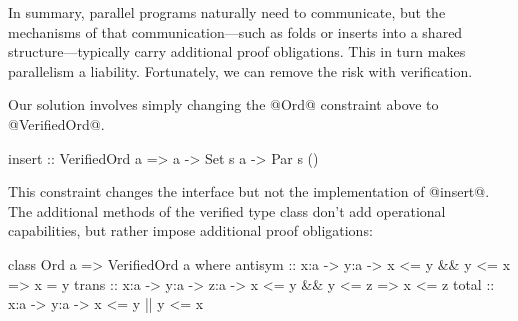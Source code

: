 
In summary, parallel programs naturally need to communicate,
but the mechanisms of that communication---such as folds or
inserts into a shared structure---typically carry additional
proof obligations.  This in turn makes parallelism a liability.
Fortunately, we can remove the risk with verification.




%
Our solution involves simply changing the @Ord@ constraint above to
@VerifiedOrd@.
%
\begin{mcode}
    insert :: VerifiedOrd a => a -> Set s a -> Par s ()
\end{mcode}
%
This constraint changes the interface but not the implementation of @insert@.
%
%
The additional methods of the verified type class don't add operational
capabilities, but rather impose additional proof obligations:

\begin{code}
    class Ord a => VerifiedOrd a where
      antisym :: x:a -> y:a -> { x <= y && y <= x => x = y }
      trans   :: x:a -> y:a -> z:a -> { x <= y && y <= z => x <= z }
      total   :: x:a -> y:a -> { x <= y || y <= x }
\end{code}

